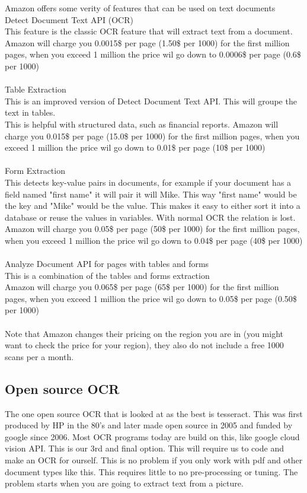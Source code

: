 Amazon offers some verity of features that can be used on text documents
\\
Detect Document Text API (OCR)\\
This feature is the classic OCR feature that will extract text from a document.\\
Amazon will charge you 0.0015\$ per page (1.50\$ per 1000) for the first million pages, when you exceed 1 million the price wil go down to
0.0006\$ per page (0.6\$ per 1000)
\\\\
Table Extraction\\
This is an improved version of Detect Document Text API. This will groupe the text in tables.\\
This is helpful with structured data, such as financial reports.
Amazon will charge you 0.015\$ per page (15.0\$ per 1000) for the first million pages, when you exceed 1 million the price wil go down to
0.01\$ per page (10\$ per 1000)
\\\\
Form Extraction\\
This detects key-value pairs in documents, for example if your document has a field named "first name" it will pair it will Mike.
This way "first name" would be the key and "Mike" would be the value.
This makes it easy to either sort it into a database or reuse the values in variables.
With normal OCR the relation is lost.\\
Amazon will charge you 0.05\$ per page (50\$ per 1000) for the first million pages, when you exceed 1 million the price wil go down to
0.04\$ per page (40\$ per 1000)
\\\\
Analyze Document API for pages with tables and forms\\
This is a combination of the tables and forms extraction\\
Amazon will charge you 0.065\$ per page (65\$ per 1000) for the first million pages, when you exceed 1 million the price wil go down to
0.05\$ per page (0.50\$ per 1000)
\\\\
Note that Amazon changes their pricing on the region you are in (you might want to check the price for your region), they also do not include a free 1000 scans per a month.

\subsection{Open source OCR}\label{subsec:Open source}
The one open source OCR that is looked at as the best is tesseract.
This was first produced by HP in the 80's and later made open source in 2005 and funded by google since 2006.
Most OCR programs today are build on this, like google cloud vision API. This is our 3rd and final option.
This will require us to code and make an OCR for ourself.
This is no problem if you only work with pdf and other document types like this.
This requires little to no pre-processing or tuning.
The problem starts when you are going to extract text from a picture.


